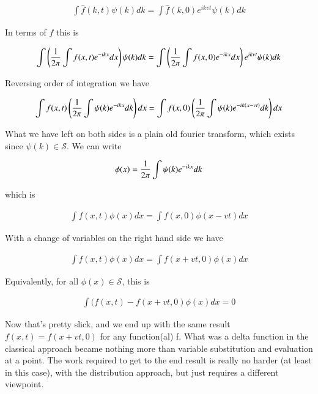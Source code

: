 \documentclass{article}
\newcommand{\Sw}[0]{\mathcal{S}}
\begin{document}
\begin{align*}
\int {\hat{f}}(k,t) \psi(k) dk = \int \hat{f}(k,0) e^{i k v t} \psi(k) dk
\end{align*}

In terms of $f$ this is

\begin{align*}
\int \left( \frac{1}{2\pi} \int f(x,t) e^{-i k x} dx \right) \psi(k) dk = \int \left(\frac{1}{2\pi} \int f(x,0) e^{-i k x} dx \right) e^{i k v t} \psi(k) dk
\end{align*}

Reversing order of integration we have

\begin{align*}
\int f(x,t) \left( \frac{1}{2\pi} \int \psi(k) e^{-i k x} dk \right) dx = \int f(x,0) \left(\frac{1}{2\pi} \int \psi(k) e^{-i k (x - v t)} dk \right) dx
\end{align*}

What we have left on both sides is a plain old fourier transform, which exists since $\psi(k) \in \Sw$. We can write

\begin{align*}
\phi(x) = \frac{1}{2\pi} \int \psi(k) e^{-i k x} dk 
\end{align*}

which is

\begin{align*}
\int f(x,t) \phi(x) dx = \int f(x,0) \phi(x - vt) dx
\end{align*}

With a change of variables on the right hand side we have

\begin{align*}
\int f(x,t) \phi(x) dx = \int f(x + vt,0) \phi(x) dx
\end{align*}

Equivalently, for all $\phi(x) \in \Sw$, this is

\begin{align*}
\int (f(x,t) - f(x + vt, 0) \phi(x) dx = 0
\end{align*}

Now that's pretty slick, and we end up with the same result $f(x,t) = f(x + vt, 0)$ for any function(al) f.
What was a delta function in the classical approach became nothing more than variable substitution and evaluation at a point.  The work required to get to the end result
is really no harder (at least in this case), with the distribution approach, but just requires a different viewpoint.
\end{document}
